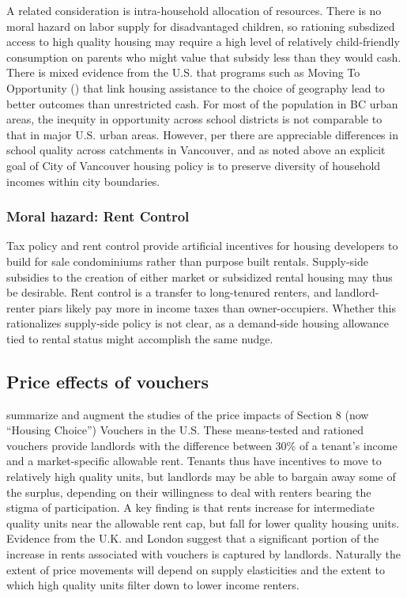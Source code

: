 \documentclass[12pt]{article}
\begin{document}
A related consideration is intra-household allocation of resources. There is no moral hazard on labor supply for disadvantaged children, so rationing subsdized access to high quality housing may require a high level of relatively child-friendly consumption on parents who might value that subsidy less than they would cash. There is mixed evidence from the U.S. that programs such as Moving To Opportunity (\textcite{KatzKlingLiebman}) that link housing assistance to the choice of geography lead to better outcomes than unrestricted cash. For most of the population in BC urban areas, the inequity in opportunity across school districts is not comparable to that in major U.S. urban areas. However, per \textcite{RiesSomerville} there are appreciable differences in school quality across catchments in Vancouver, and as noted above an explicit goal of City of Vancouver housing policy is to preserve diversity of household incomes within city boundaries.

\subsubsection{Moral hazard: Rent Control}

Tax policy and rent control provide artificial incentives for housing developers to build for sale condominiums rather than purpose built rentals. Supply-side subsidies to the creation of either market or subsidized rental housing may thus be desirable. Rent control is a transfer to long-tenured renters, and landlord-renter piars likely pay more in income taxes than owner-occupiers. Whether this rationalizes supply-side policy is not clear, as a demand-side housing allowance tied to rental status might accomplish the same nudge.

\subsection{Price effects of vouchers}

\textcite{EriksenRoss} summarize and augment the studies of the price impacts of Section 8 (now ``Housing Choice'') Vouchers in the U.S. These means-tested and rationed vouchers provide landlords with the difference between 30\% of a tenant's income and a market-specific allowable rent. Tenants thus have incentives to move to relatively high quality units, but landlords may be able to bargain away some of the surplus, depending on their willingness to deal with renters bearing the stigma of participation. A key finding is that rents increase for intermediate quality units near the allowable rent cap, but fall for lower quality housing units. Evidence from the U.K. and London suggest that a significant portion of the increase in rents associated with vouchers is captured by landlords. Naturally the extent of price movements will depend on supply elasticities and the extent to which high quality units filter down to lower income renters.
\end{document}
